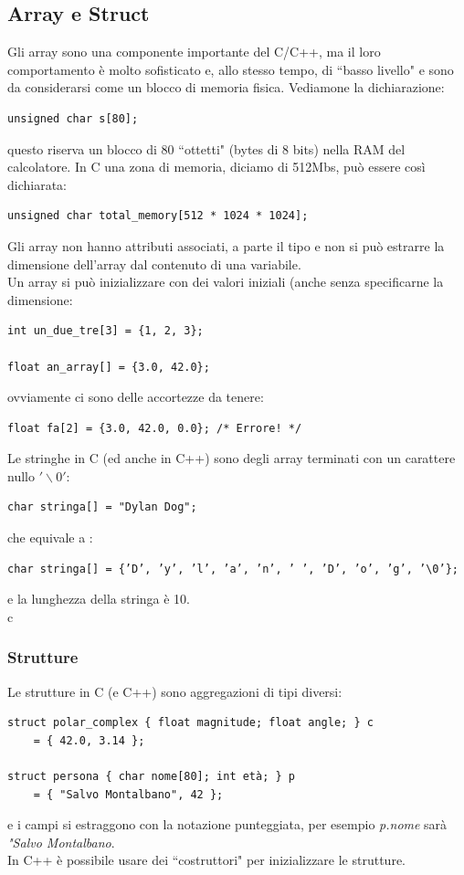 \documentclass[a4paper,12pt, oneside]{book}
\begin{document}
\subsection{Array e Struct}
Gli array sono una componente importante del C/C++, ma il loro comportamento è molto sofisticato e, allo stesso tempo, di “basso livello" e sono da considerarsi come un blocco di memoria fisica. Vediamone la dichiarazione:
\begin{verbatim}
unsigned char s[80];
\end{verbatim}
questo riserva un blocco di 80 “ottetti" (bytes di 8 bits) nella RAM del calcolatore. In C una zona di memoria, diciamo di 512Mbs, può essere così dichiarata:
\begin{verbatim}
unsigned char total_memory[512 * 1024 * 1024];
\end{verbatim}
Gli array non hanno attributi associati, a parte il tipo e non si può estrarre la dimensione dell’array dal contenuto di una variabile.\\
Un array si può inizializzare con dei valori iniziali (anche senza specificarne la dimensione:
\begin{verbatim}
int un_due_tre[3] = {1, 2, 3};

float an_array[] = {3.0, 42.0};
\end{verbatim}
ovviamente ci sono delle accortezze da tenere:
\begin{verbatim}
float fa[2] = {3.0, 42.0, 0.0}; /* Errore! */
\end{verbatim}
Le stringhe in C (ed anche in C++) sono degli array terminati
con un carattere nullo $'\backslash 0'$:
\begin{verbatim}
char stringa[] = "Dylan Dog";
\end{verbatim}
che equivale a :
\begin{verbatim}
char stringa[] = {’D’, ’y’, ’l’, ’a’, ’n’, ’ ’, ’D’, ’o’, ’g’, ’\0’};
\end{verbatim}
e la lunghezza della stringa è 10.\\c
\subsubsection{Strutture}
Le strutture in C (e C++) sono aggregazioni di tipi diversi:
\begin{verbatim}
struct polar_complex { float magnitude; float angle; } c
    = { 42.0, 3.14 };

struct persona { char nome[80]; int età; } p
    = { "Salvo Montalbano", 42 };
\end{verbatim}
e i campi si estraggono con la notazione punteggiata, per esempio \textit{p.nome} sarà \textit{"Salvo Montalbano}.\\
In C++ è possibile usare dei “costruttori" per inizializzare le strutture.
\end{document}
